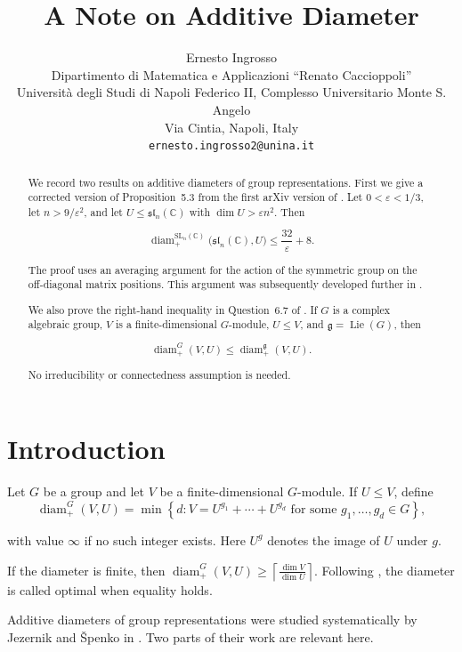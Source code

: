 \documentclass[11pt]{article}
\title{A Note on Additive Diameter}
\author{Ernesto Ingrosso\\[0.4em]
\small Dipartimento di Matematica e Applicazioni ``Renato Caccioppoli''\\
\small Universit\`a degli Studi di Napoli Federico II, Complesso Universitario Monte S. Angelo\\
\small Via Cintia, Napoli, Italy\\
\small \texttt{ernesto.ingrosso2@unina.it}}
\date{}
\theoremstyle{remark}
\newcommand{\C}{\mathbb C}
\begin{document}
\maketitle

\begin{abstract}
We record two results on additive diameters of group representations. First we give a corrected version of Proposition~5.3 from the first arXiv version of \cite{JezernikSpenko}. Let $0<\varepsilon<1/3$, let $n>9/\varepsilon^2$, and let $U\leq \mathfrak{sl}_n(\C)$ with $\dim U>\varepsilon n^2$. Then

$$
\operatorname{diam}^{\mathrm{SL}_n(\C)}_{+}
\bigl(\mathfrak{sl}_n(\C),U\bigr)
\leq
\frac{32}{\varepsilon}+8.
$$

The proof uses an averaging argument for the action of the symmetric group on the off-diagonal matrix positions. This argument was subsequently developed further in \cite{JezernikSpenko2026}.

We also prove the right-hand inequality in Question~6.7 of \cite{JezernikSpenko}. If $G$ is a complex algebraic group, $V$ is a finite-dimensional $G$-module, $U\leq V$, and $\mathfrak g=\operatorname{Lie}(G)$, then

$$
\operatorname{diam}^{G}_{+}(V,U)
\leq
\operatorname{diam}^{\mathfrak g}_{+}(V,U).
$$

No irreducibility or connectedness assumption is needed.
\end{abstract}

\section{Introduction}

Let $G$ be a group and let $V$ be a finite-dimensional $G$-module. If $U\leq V$, define
$$
\operatorname{diam}^{G}_{+}(V,U)
=
\min\left\{
d:
V=U^{g_1}+\cdots+U^{g_d}
\text{ for some }g_1,\ldots,g_d\in G
\right\},
$$

with value $\infty$ if no such integer exists. Here $U^g$ denotes the image of $U$ under $g$.

If the diameter is finite, then $
\operatorname{diam}^{G}_{+}(V,U)
\geq
\left\lceil\frac{\dim V}{\dim U}\right\rceil.
$ Following \cite{JezernikSpenko}, the diameter is called optimal when equality holds.

Additive diameters of group representations were studied systematically by Jezernik and \v{S}penko in \cite{JezernikSpenko}. Two parts of their work are relevant here.
\end{document}
